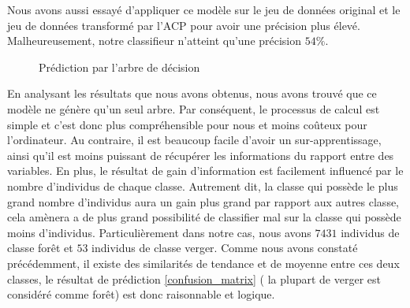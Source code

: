 \documentclass[twocolumn,10pt]{article}
\begin{document}
Nous avons aussi essayé d'appliquer ce modèle sur le jeu de données original et le jeu de données transformé par l'ACP pour avoir une précision plus élevé. Malheureusement, notre classifieur n'atteint qu'une précision $54\%$.

\begin{figure}[htbp]
	\centering
	\qquad
	\caption{Prédiction par l'arbre de décision}%
	\label{fig:DTree}%
\end{figure}

En analysant les résultats que nous avons obtenus, nous avons trouvé que ce modèle ne génère qu'un seul arbre. Par conséquent, le processus de calcul est simple et c'est donc plus compréhensible pour nous et moins coûteux pour l'ordinateur. Au contraire, il est beaucoup facile d'avoir un sur-apprentissage, ainsi qu'il est moins puissant de récupérer les informations du rapport entre des variables. En plus, le résultat de gain d'information est facilement influencé par le nombre d'individus de chaque classe. Autrement dit, la classe qui possède le plus grand nombre d'individus aura un gain plus grand par rapport aux autres classe, cela amènera a de plus grand possibilité de classifier mal sur la classe qui possède moins d'individus. Particulièrement dans notre cas, nous avons $ 7431 $ individus de classe forêt et $ 53 $ individus de classe verger. Comme nous avons constaté précédemment, il existe des similarités de tendance et de moyenne entre ces deux classes, le résultat de prédiction \ref{confusion_matrix} ( la plupart de verger est considéré comme forêt) est donc raisonnable et logique.
\end{document}
